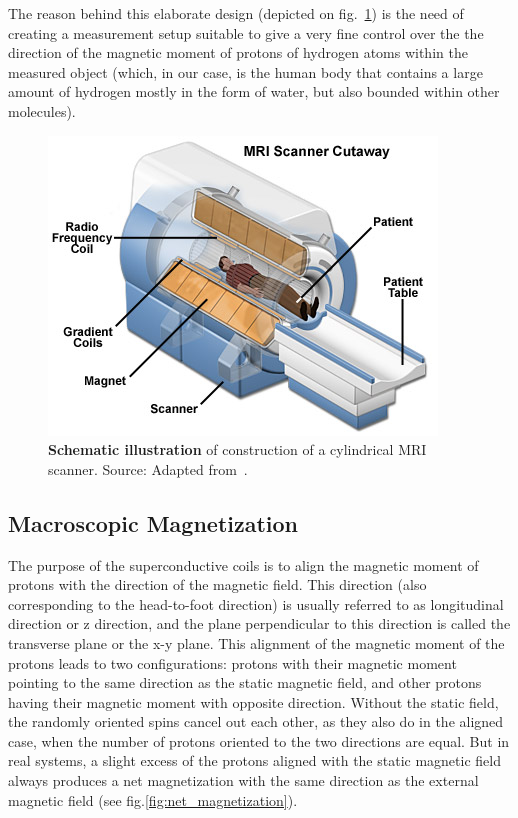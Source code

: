 The reason behind this elaborate design (depicted on fig.~\ref{fig:mri_schematic}) is the need of creating a measurement setup suitable to give a very fine control over the the direction of the magnetic moment of protons of hydrogen atoms within the measured object (which, in our case, is the human body that contains a large amount of hydrogen mostly in the form of water, but also bounded within other molecules).

\begin{figure}
    \centering
    \includegraphics[width=.5\linewidth]{images/mri-scanner.jpg}
    \caption{\textbf{Schematic illustration} of construction of a cylindrical MRI scanner. Source: Adapted from~\cite{coyne_mri_2020}.}
    \label{fig:mri_schematic}
\end{figure}

\subsection{Macroscopic Magnetization}
The purpose of the superconductive coils is to align the magnetic moment of protons with the direction of the magnetic field. This direction (also corresponding to the head-to-foot direction) is usually referred to as longitudinal direction or z direction, and the plane perpendicular to this direction is called the transverse plane or the x-y plane. This alignment of the magnetic moment of the protons leads to two configurations: protons with their magnetic moment pointing to the same direction as the static magnetic field, and other protons having their magnetic moment with opposite direction. Without the static field, the randomly oriented spins cancel out each other, as they also do in the aligned case, when the number of protons oriented to the two directions are equal. But in real systems, a slight excess of the protons aligned with the static magnetic field always produces a net magnetization with the same direction as the external magnetic field (see fig.\ref{fig:net_magnetization}).

